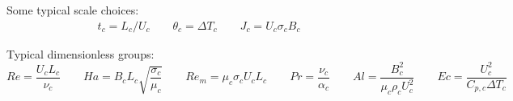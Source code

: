 \documentclass[11pt]{article}
\begin{document}
Some typical scale choices:
\begin{equation}\begin{aligned}
	t_c = L_c/ U_c \qquad
	\theta_c = \Delta T_c \qquad
	J_c = U_c \sigma_c B_c \qquad
\end{aligned}\end{equation}

Typical dimensionless groups:
\begin{equation}
	Re = \frac{U_c L_c}{\nu_c} \qquad
	Ha = B_c L_c \sqrt{\frac{\sigma_c}{\mu_c}} \qquad
	Re_m = \mu_c \sigma_c U_c L_c \qquad
	Pr = \frac{\nu_c}{\alpha_c} \qquad
	Al = \frac{B_c^2}{\mu_c \rho_c U_c^2} \qquad
	Ec = \frac{U_c^2}{C_{p,c} \Delta T_c} \qquad
\end{equation}
\end{document}
